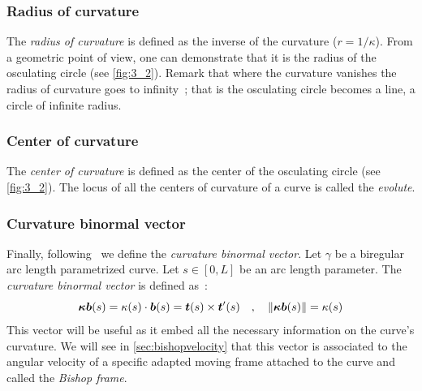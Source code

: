 \subsubsection{Radius of curvature}
The \emph{radius of curvature} is defined as the inverse of the curvature ($r= 1/\kappa$). From a geometric point of view, one can demonstrate that it is the radius of the osculating circle (see \cref{fig:3_2}). Remark that where the curvature vanishes the radius of curvature goes to infinity~; that is the osculating circle becomes a line, a circle of infinite radius.

\subsubsection{Center of curvature}
The \emph{center of curvature} is defined as the center of the osculating circle (see \cref{fig:3_2}). The locus of all the centers of curvature of a curve is called the \emph{evolute}.

\subsubsection{Curvature binormal vector}
\label{sec:kb}
Finally, following~\cite{Bergou2008} we define the \emph{curvature binormal vector}. Let $\gamma$ be a biregular arc length parametrized curve. Let $s\in [0,L]$ be an arc length parameter. The \emph{curvature binormal vector} is defined as~:
\begin{equation}
	\boldsymbol{\kappa b}(s) = \kappa(s)\cdot\boldsymbol{b}(s) = \boldsymbol{t}(s) \times \boldsymbol{t}'(s)
	\quad,\quad
	\lVert\boldsymbol{\kappa b}(s)\rVert= \kappa(s)
\label{eq:kb}
\end{equation}
This vector will be useful as it embed all the necessary information on the curve's curvature. We will see in \cref{sec:bishopvelocity} that this vector is associated to the angular velocity of a specific adapted moving frame attached to the curve and called the \emph{Bishop frame}.

